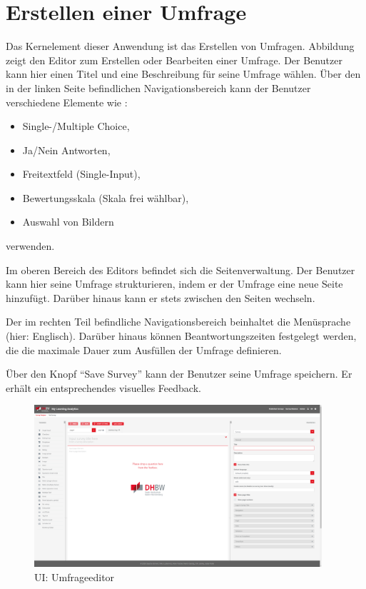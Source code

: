 \section{Erstellen einer Umfrage}
\label{ssec:CreateMaster}

Das Kernelement dieser Anwendung ist das Erstellen von Umfragen.
Abbildung~ zeigt den Editor zum Erstellen oder Bearbeiten einer Umfrage. \newline
Der Benutzer kann hier einen Titel und eine Beschreibung für seine Umfrage wählen.
Über den in der linken Seite befindlichen Navigationsbereich kann der Benutzer verschiedene Elemente wie \ua:
% 
\begin{itemize}
    \item Single-/Multiple Choice,
    \item Ja/Nein Antworten,
    \item Freitextfeld (Single-Input),
    \item Bewertungsskala (Skala frei wählbar),
    \item Auswahl von Bildern
\end{itemize}
% 
verwenden.

Im oberen Bereich des Editors befindet sich die Seitenverwaltung.
Der Benutzer kann hier seine Umfrage strukturieren, indem er der Umfrage eine neue Seite hinzufügt.
Darüber hinaus kann er stets zwischen den Seiten wechseln.

Der im rechten Teil befindliche Navigationsbereich beinhaltet \ua die Menüsprache (hier: Englisch).
Darüber hinaus können Beantwortungszeiten festgelegt werden, die die maximale Dauer zum Ausfüllen der Umfrage definieren.

Über den Knopf \enquote{Save Survey} kann der Benutzer seine Umfrage speichern.
Er erhält ein entsprechendes visuelles Feedback.

\begin{figure}[H]
	\centering
	\includegraphics[width=0.95\textwidth, keepaspectratio]{img/guide/SurveyTemplate.png}
	\captionsetup{justification=centering, format=plain}
	\caption[\acl{UI}: Umfrageeditor]{\acl{UI}: Umfrageeditor \\\quelleScreenshot}
	\label{fig:Umfrageeditor}
\end{figure}

